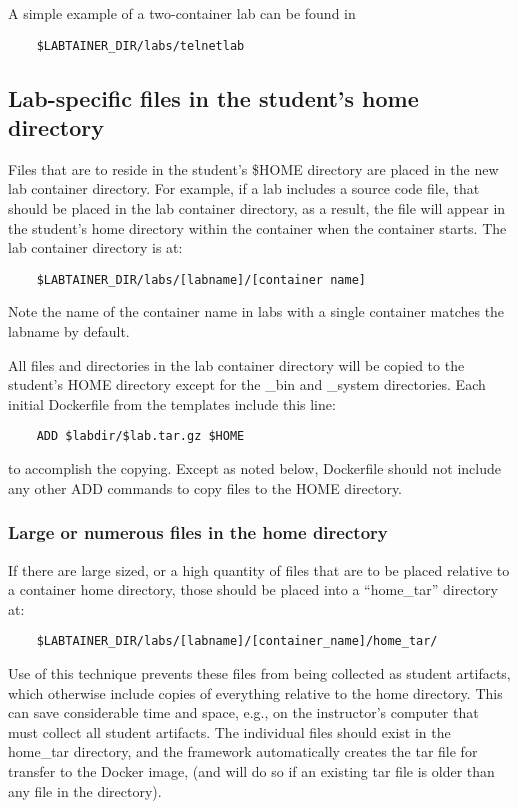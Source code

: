 \documentclass[12pt]{article}
\begin{document}
A simple example of a two-container lab can be found in 
\begin{verbatim}
    $LABTAINER_DIR/labs/telnetlab
\end{verbatim}


\subsection {Lab-specific files in the student's home directory}
Files that are to reside in the student's \$HOME directory are placed in the 
new lab container directory.  For example, if a lab includes a source code file, that
should be placed in the lab container directory, as a result, the file will appear in the student's
home directory within the container when the container starts.  The lab container
directory is at:  

\begin{verbatim}
    $LABTAINER_DIR/labs/[labname]/[container name]
\end{verbatim}
Note the name of the container name in labs with a single container matches the labname by default.

All files and directories in the lab container directory will be copied to the student's HOME
directory except for the \_bin and \_system directories.
Each initial Dockerfile from the templates include this line:
\begin{verbatim}
    ADD $labdir/$lab.tar.gz $HOME
\end{verbatim}
to accomplish the copying. Except as noted below, Dockerfile should not include any other ADD commands
to copy files to the HOME directory.
\subsubsection{Large or numerous files in the home directory} \label{large files}
If there are large sized, or a high quantity of files that are to be placed relative to a 
container home directory, those should be placed into a ``home\_tar'' directory at:
\begin{verbatim}
    $LABTAINER_DIR/labs/[labname]/[container_name]/home_tar/
\end{verbatim}
\noindent Use of this technique prevents these files from being collected as student artifacts, which
otherwise include copies of everything relative to the home directory.  This
can save considerable time and space, e.g., on the instructor's computer that must collect
all student artifacts.
The individual files should exist in the home\_tar directory, and the framework automatically
creates the tar file for transfer to the Docker image, (and will do so if an existing tar file
is older than any file in the directory).
\end{document}
